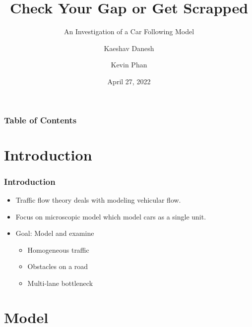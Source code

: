 \documentclass{beamer}
\title[An Investigation of a Car Following Model]{Check Your Gap or Get Scrapped}
\subtitle{An Investigation of a Car Following Model}
\author[Kaeshav Danesh \and Kevin Phan]{Kaeshav Danesh \and Kevin Phan}
\date{April 27, 2022}
\begin{document}
\frame{\titlepage}

\begin{frame}
    \frametitle{Table of Contents}
    \tableofcontents
    \end{frame}

\section{Introduction}

\begin{frame}
\frametitle{Introduction}
\begin{itemize}
  \item Traffic flow theory deals with modeling vehicular flow.  
  \item Focus on microscopic model which model cars as a single unit.
  \item Goal: Model and examine 
  \begin{itemize}
    \item Homogeneous traffic
    \item Obstacles on a road
    \item Multi-lane bottleneck
  \end{itemize} 
\end{itemize}
\end{frame}

\section{Model}
\end{document}
